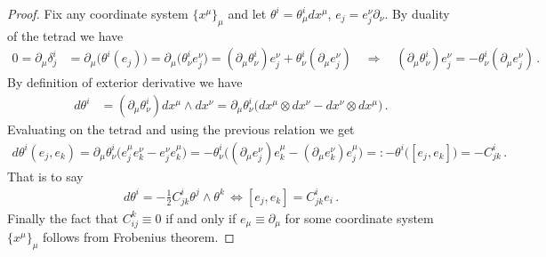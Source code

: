 \begin{proof}
Fix any coordinate system $\{x^\mu\}_\mu$ and let $\theta^i = \theta^i_\mu dx^\mu$, $e_j = e_j^\nu \partial_\nu$.
By duality of the tetrad we have
\begin{align}
    0= \partial_\mu \delta^i_j &= \partial_\mu \big(\theta^i (e_j) \big) = \partial_\mu\big(\theta^i_\nu e_j^\nu \big) = (\partial_\mu \theta^i_\nu) e_j^\nu + \theta^i_\nu (\partial_\mu e_j^\nu)
    \quad \Rightarrow\quad (\partial_\mu \theta^i_\nu) e_j^\nu =- \theta^i_\nu (\partial_\mu e_j^\nu)\,.
\end{align}
By definition of exterior derivative we have
\begin{align}
    d \theta^i &= (\partial_\mu \theta^i_\nu) dx^\mu \wedge dx^\nu = \partial_\mu \theta^i_\nu \Big(dx^\mu\otimes dx^\nu- dx^\nu \otimes dx^\mu \Big)\,.
\end{align}
Evaluating on the tetrad and using the previous relation we get
\begin{align}
    d\theta^i (e_j, e_k) 
    = \partial_\mu \theta^i_\nu \Big( e_j^\mu e_k^\nu - e_j^\nu e_k^\mu \Big) 
    = - \theta^i_\nu \Big( (\partial_\mu e_j^\nu) e_k^\mu - (\partial_\mu e_k^\nu) e_j^\mu \Big) 
     =: - \theta^i \big( [e_j, e_k]\big) = - C^i_{jk}\,.
\end{align}
That is to say
\begin{align}
    d\theta^i = - \frac{1}{2} C^i_{jk} \theta^j \wedge \theta^k\, \Leftrightarrow [e_j, e_k] = C^i_{jk} e_i\,.
\end{align}
Finally the fact that $C_{ij}^k \equiv 0$ if and only if $e_\mu\equiv \partial_\mu$ for some coordinate system $\{x^\mu\}_\mu$ follows from Frobenius theorem.
%
\end{proof}



